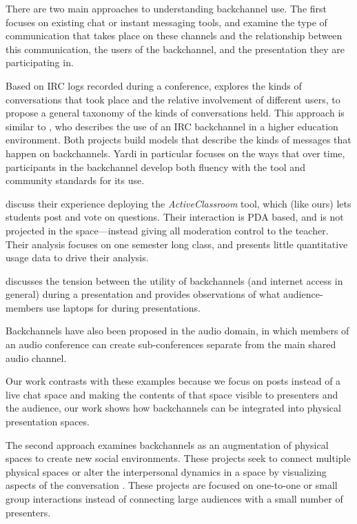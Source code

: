 There are two main approaches to understanding backchannel use. The first focuses on existing chat or instant messaging tools, and examine the type of communication that takes place on these channels and the relationship between this communication, the users of the backchannel, and the presentation they are participating in.

Based on IRC logs recorded during a conference, \citet{mccarthy_digital_2004} explores the kinds of conversations that took place and the relative involvement of different users, to propose a general taxonomy of the kinds of conversations held. This approach is similar to \citet{Yardi:2006uk}, who describes the use of an IRC backchannel in a higher education environment. Both projects build models that describe the kinds of messages that happen on backchannels. Yardi in particular focuses on the ways that over time, participants in the backchannel develop both fluency with the tool and community standards for its use.

\citet{Ratto:2003vs} discuss their experience deploying the \emph{ActiveClassroom} tool, which (like ours) lets students post and vote on questions. Their interaction is PDA based, and is not projected in the space---instead giving all moderation control to the teacher. Their analysis focuses on one semester long class, and presents little quantitative usage data to drive their analysis.

\citet{Golub:2005ws} discusses the tension between the utility of backchannels (and internet access in general) during a presentation and provides observations of what audience-members use laptops for during presentations.

Backchannels have also been proposed in the audio domain, in which members of an audio conference can create sub-conferences separate from the main shared audio channel. \citep{Yankelovich:2005bx}

Our work contrasts with these examples because we focus on posts instead of a live chat space and making the contents of that space visible to presenters and the audience, our work shows how backchannels can be integrated into physical presentation spaces. 

The second approach examines backchannels as an augmentation of physical spaces to create new social environments. These projects seek to connect multiple physical spaces \citep{Karahalios:2004eg} or alter the interpersonal dynamics in a space by visualizing aspects of the conversation \citep{DiMicco:2007ie,Donath:1999kw,Bergstrom:2007je}. These projects are focused on one-to-one or small group interactions instead of connecting large audiences with a small number of presenters.

